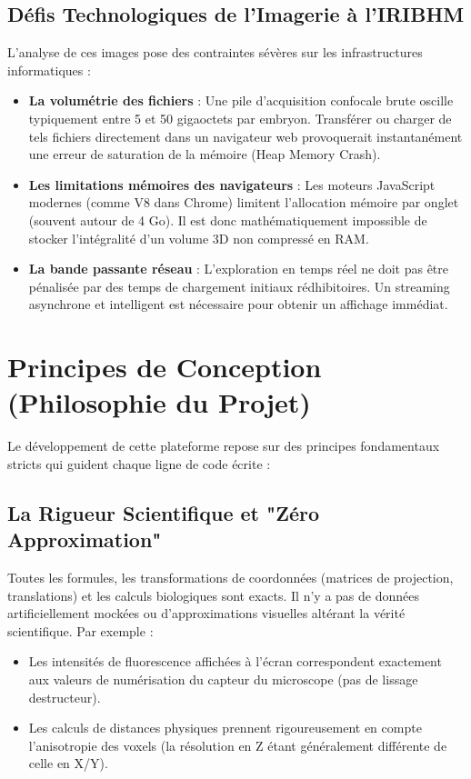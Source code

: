 \subsection{Défis Technologiques de l'Imagerie à l'IRIBHM}
L'analyse de ces images pose des contraintes sévères sur les infrastructures informatiques :
\begin{itemize}
    \item \textbf{La volumétrie des fichiers} : Une pile d'acquisition confocale brute oscille typiquement entre 5 et 50 gigaoctets par embryon. Transférer ou charger de tels fichiers directement dans un navigateur web provoquerait instantanément une erreur de saturation de la mémoire (Heap Memory Crash).
    \item \textbf{Les limitations mémoires des navigateurs} : Les moteurs JavaScript modernes (comme V8 dans Chrome) limitent l'allocation mémoire par onglet (souvent autour de 4 Go). Il est donc mathématiquement impossible de stocker l'intégralité d'un volume 3D non compressé en RAM.
    \item \textbf{La bande passante réseau} : L'exploration en temps réel ne doit pas être pénalisée par des temps de chargement initiaux rédhibitoires. Un streaming asynchrone et intelligent est nécessaire pour obtenir un affichage immédiat.
\end{itemize}

\section{Principes de Conception (Philosophie du Projet)}

Le développement de cette plateforme repose sur des principes fondamentaux stricts qui guident chaque ligne de code écrite :

\subsection{La Rigueur Scientifique et "Zéro Approximation"}
Toutes les formules, les transformations de coordonnées (matrices de projection, translations) et les calculs biologiques sont exacts. Il n'y a pas de données artificiellement mockées ou d'approximations visuelles altérant la vérité scientifique. Par exemple :
\begin{itemize}
    \item Les intensités de fluorescence affichées à l'écran correspondent exactement aux valeurs de numérisation du capteur du microscope (pas de lissage destructeur).
    \item Les calculs de distances physiques prennent rigoureusement en compte l'anisotropie des voxels (la résolution en Z étant généralement différente de celle en X/Y).
\end{itemize}

